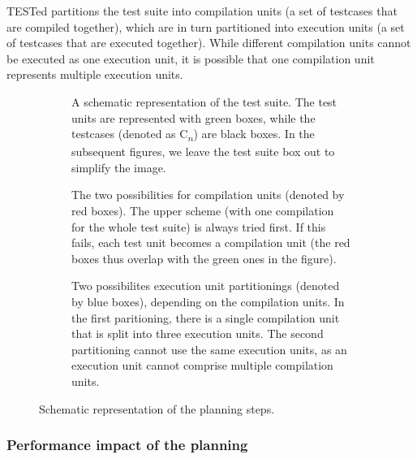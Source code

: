 \documentclass[../main]{subfiles}
\begin{document}
TESTed partitions the test suite into compilation units (a set of testcases that are compiled together), which are in turn partitioned into execution units (a set of testcases that are executed together).
While different compilation units cannot be executed as one execution unit, it is possible that one compilation unit represents multiple execution units.

\begin{figure}
    \begin{subfigure}{\textwidth}
        \centering
        
        \caption{
            A schematic representation of the test suite.
            The test units are represented with green boxes, while the testcases (denoted as C\textsubscript{$n$}) are black boxes.
            In the subsequent figures, we leave the test suite box out to simplify the image.
        }
        \label{fig:planning-suite}
    \end{subfigure}
    \par\bigskip
    \begin{subfigure}{\textwidth}
        \centering
        
        \caption{
            The two possibilities for compilation units (denoted by red boxes).
            The upper scheme (with one compilation for the whole test suite) is always tried first.
            If this fails, each test unit becomes a compilation unit (the red boxes thus overlap with the green ones in the figure).
        }
        \label{fig:planning-compilation}
    \end{subfigure}
    \par\bigskip
    \begin{subfigure}{\textwidth}
        \centering
        
        \caption{
            Two possibilites execution unit partitionings (denoted by blue boxes), depending on the compilation units.
            In the first paritioning, there is a single compilation unit that is split into three execution units.
            The second partitioning cannot use the same execution units, as an execution unit cannot comprise multiple compilation units.
        }
        \label{fig:planning-execution}
    \end{subfigure}
    \caption{Schematic representation of the planning steps.}
\end{figure}

\subsubsection{Performance impact of the planning}
\end{document}
